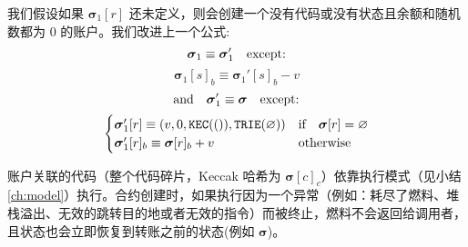 \documentclass[9pt,oneside]{amsart}
\begin{document}
\begin{multicols}{2}
我们假设如果 $\boldsymbol{\sigma}_1[r]$ 还未定义，则会创建一个没有代码或没有状态且余额和随机数都为 0 的账户。我们改进上一个公式:
\begin{equation}
\boldsymbol{\sigma}_1 \equiv \boldsymbol{\sigma}_1' \quad \text{except:} \\
\end{equation}
\begin{equation}
\boldsymbol{\sigma}_1[s]_b \equiv \boldsymbol{\sigma}_1'[s]_b - v
\end{equation}
\begin{equation}
\text{and}\quad \boldsymbol{\sigma}_1' \equiv \boldsymbol{\sigma} \quad \text{except:} \\
\end{equation}
\begin{equation}
\begin{cases}
\boldsymbol{\sigma}_1'[r] \equiv (v, 0, \mathtt{\tiny KEC}(()), \mathtt{\tiny TRIE}(\varnothing)) & \text{if} \quad \boldsymbol{\sigma}[r] = \varnothing \\
\boldsymbol{\sigma}_1'[r]_b \equiv \boldsymbol{\sigma}[r]_b + v & \text{otherwise}
\end{cases}
\end{equation}


账户关联的代码（整个代码碎片，Keccak 哈希为  $\boldsymbol{\sigma}[c]_c$）依靠执行模式（见小结 \ref{ch:model}）执行。合约创建时，如果执行因为一个异常（例如：耗尽了燃料、堆栈溢出、无效的跳转目的地或者无效的指令）而被终止，燃料不会返回给调用者，且状态也会立即恢复到转账之前的状态(例如 $\boldsymbol{\sigma}$)。


\end{multicols}
\end{document}
